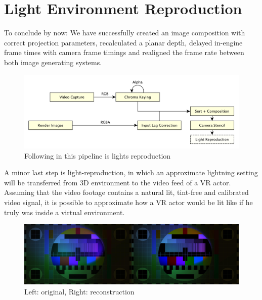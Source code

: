 %
\section{Light Environment Reproduction}

To conclude by now: We have successfully created an image composition with 
correct projection parameters, recalculated a planar depth, delayed in-engine 
frame times with camera frame timings and realigned the frame rate between both 
image generating systems.

\begin{figure}[htb]
	\includegraphics[width=\textwidth]{_raw_resources/pipeline_steps/4_7_lights.pdf}
	\caption{Following in this pipeline is lights reproduction}
	\label{fig:steps:lights}
\end{figure}

A minor last step is light-reproduction, in which an approximate lightning 
setting will be transferred from 3D environment to the video feed of a VR 
actor. Assuming that the video footage contains a natural lit, tint-free and 
calibrated video signal, it is possible to approximate how a VR actor would 
be lit like if he truly was inside a virtual environment.

\begin{figure}[htb]
	\includegraphics[width=\textwidth]{_raw_resources/light-reconstruction/comparison.jpg}
	\caption{Left: original, Right: reconstruction}
	\label{fig:light-reconstruction:comparison}
\end{figure}

